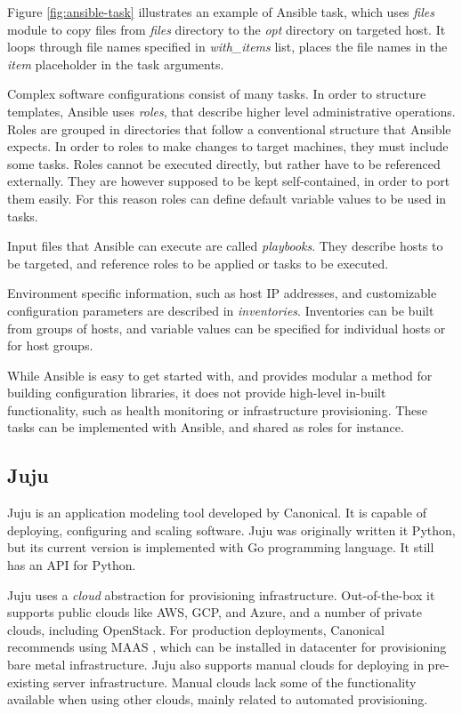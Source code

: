 Figure \ref{fig:ansible-task} illustrates an example of Ansible task, which
uses \textit{files} module to copy files from \textit{files} directory to the
\textit{opt} directory on targeted host. It loops through file names specified
in \textit{with\_items} list, places the file names in the \textit{item}
placeholder in the task arguments.

Complex software configurations consist of many tasks. In order to structure
templates, Ansible uses \textit{roles}, that describe higher level
administrative operations. Roles are grouped in directories that follow a
conventional structure that Ansible expects. In order to roles to make changes
to target machines, they must include some tasks. Roles cannot be executed
directly, but rather have to be referenced externally. They are however
supposed to be kept self-contained, in order to port them easily. For this
reason roles can define default variable values to be used in tasks.

Input files that Ansible can execute are called \textit{playbooks}. They
describe hosts to be targeted, and reference roles to be applied or tasks to be
executed.

Environment specific information, such as host IP addresses, and customizable
configuration parameters are described in \textit{inventories}. Inventories can
be built from groups of hosts, and variable values can be specified for
individual hosts or for host groups.

While Ansible is easy to get started with, and provides modular a method for
building configuration libraries, it does not provide high-level in-built
functionality, such as health monitoring or infrastructure provisioning. These
tasks can be implemented with Ansible, and shared as roles for instance.

\subsection{Juju}

Juju \cite{juju} is an application modeling tool developed by Canonical. It is
capable of deploying, configuring and scaling software. Juju was originally
written it Python, but its current version is implemented with Go programming
language. It still has an API for Python.

Juju uses a \textit{cloud} abstraction for provisioning infrastructure.
Out-of-the-box it supports public clouds like AWS, GCP, and Azure, and a number
of private clouds, including OpenStack. For production deployments, Canonical
recommends using MAAS \cite{maas}, which can be installed in datacenter for
provisioning bare metal infrastructure. Juju also supports manual clouds for
deploying in pre-existing server infrastructure. Manual clouds lack some of the
functionality available when using other clouds, mainly related to automated
provisioning.

